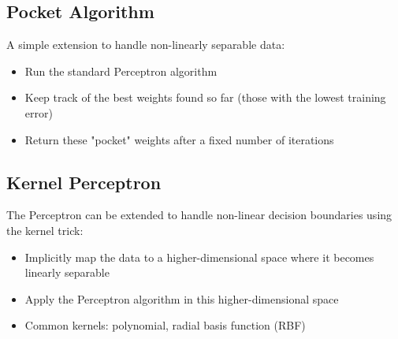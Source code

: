 \documentclass{article}
\begin{document}
\subsection{Pocket Algorithm}
A simple extension to handle non-linearly separable data:
\begin{itemize}
    \item Run the standard Perceptron algorithm
    \item Keep track of the best weights found so far (those with the lowest training error)
    \item Return these "pocket" weights after a fixed number of iterations
\end{itemize}

\subsection{Kernel Perceptron}
The Perceptron can be extended to handle non-linear decision boundaries using the kernel trick:
\begin{itemize}
    \item Implicitly map the data to a higher-dimensional space where it becomes linearly separable
    \item Apply the Perceptron algorithm in this higher-dimensional space
    \item Common kernels: polynomial, radial basis function (RBF)
\end{itemize}
\end{document}
